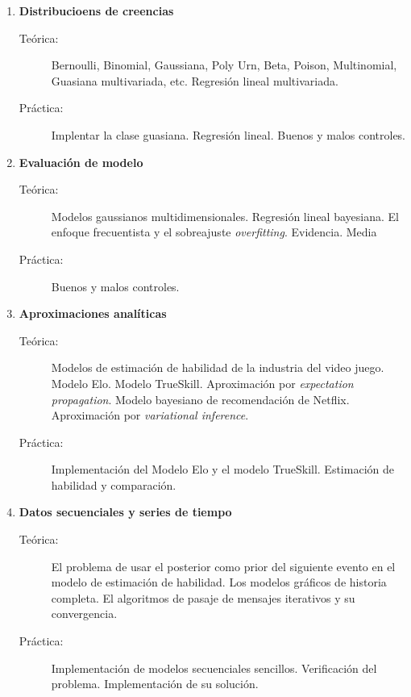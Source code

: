 \documentclass[10pt]{article}
\begin{document}
\begin{enumerate}




\vspace{0.1cm}
\item \textbf{Distribucioens de creencias}
\vspace{-0.15cm}
\begin{description}
\item[Teórica:] Bernoulli, Binomial, Gaussiana, Poly Urn, Beta, Poison, Multinomial, Guasiana multivariada, etc. Regresión lineal multivariada.
\item[Práctica:] Implentar la clase guasiana. Regresión lineal. Buenos y malos controles.
\end{description}


\vspace{0.1cm}
\item \textbf{Evaluación de modelo}
\vspace{-0.15cm}
\begin{description}
\item[Teórica:] Modelos gaussianos multidimensionales. Regresión lineal bayesiana. El enfoque frecuentista y el sobreajuste \emph{overfitting}. Evidencia. Media
\item[Práctica:] Buenos y malos controles.
\end{description}


\vspace{0.1cm}
\item \textbf{Aproximaciones analíticas}
\vspace{-0.15cm}
\begin{description}
\item[Teórica:] Modelos de estimación de habilidad de la industria del video juego. Modelo Elo. Modelo TrueSkill. Aproximación por \emph{expectation propagation}. Modelo bayesiano de recomendación de Netflix. Aproximación por \emph{variational inference}.
\item[Práctica:] Implementación del Modelo Elo y el modelo TrueSkill. Estimación de habilidad y comparación.
\end{description}


\vspace{0.1cm}
\item \textbf{Datos secuenciales y series de tiempo}
\vspace{-0.15cm}
\begin{description}
\item[Teórica:] El problema de usar el posterior como prior del siguiente evento en el modelo de estimación de habilidad. Los modelos gráficos de historia completa. El algoritmos de pasaje de mensajes iterativos y su convergencia.
\item[Práctica:] Implementación de modelos secuenciales sencillos. Verificación del problema. Implementación de su solución.
\end{description}


\end{enumerate}
\end{document}
